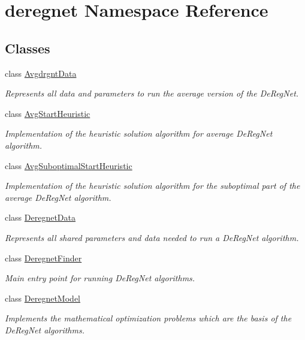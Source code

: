 \hypertarget{namespacederegnet}{}\section{deregnet Namespace Reference}
\label{namespacederegnet}
\subsection*{Classes}
\begin{DoxyCompactItemize}
\item 
class \hyperlink{classderegnet_1_1AvgdrgntData}{Avgdrgnt\+Data}
\begin{DoxyCompactList}\small\item\em Represents all data and parameters to run the average version of the De\+Reg\+Net. \end{DoxyCompactList}\item 
class \hyperlink{classderegnet_1_1AvgStartHeuristic}{Avg\+Start\+Heuristic}
\begin{DoxyCompactList}\small\item\em Implementation of the heuristic solution algorithm for average De\+Reg\+Net algorithm. \end{DoxyCompactList}\item 
class \hyperlink{classderegnet_1_1AvgSuboptimalStartHeuristic}{Avg\+Suboptimal\+Start\+Heuristic}
\begin{DoxyCompactList}\small\item\em Implementation of the heuristic solution algorithm for the suboptimal part of the average De\+Reg\+Net algorithm. \end{DoxyCompactList}\item 
class \hyperlink{classderegnet_1_1DeregnetData}{Deregnet\+Data}
\begin{DoxyCompactList}\small\item\em Represents all shared parameters and data needed to run a De\+Reg\+Net algorithm. \end{DoxyCompactList}\item 
class \hyperlink{classderegnet_1_1DeregnetFinder}{Deregnet\+Finder}
\begin{DoxyCompactList}\small\item\em Main entry point for running De\+Reg\+Net algorithms. \end{DoxyCompactList}\item 
class \hyperlink{classderegnet_1_1DeregnetModel}{Deregnet\+Model}
\begin{DoxyCompactList}\small\item\em Implements the mathematical optimization problems which are the basis of the De\+Reg\+Net algorithms. \end{DoxyCompactList}\item 

\end{DoxyCompactItemize}
